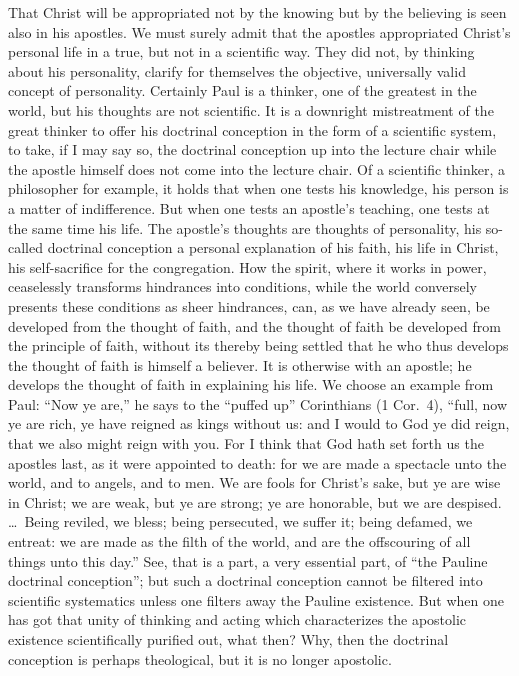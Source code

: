 \documentclass[12pt]{book}
\newcommand{\opage}[1]{\marginnote{\footnotesize\textit{[#1]}}}
\begin{document}
That Christ will be appropriated not by the knowing but by the
believing is seen also in his apostles. We must surely admit that the
apostles appropriated Christ's personal life in a
\opage{78}\setcounter{footnote}{0}%
true, but not in a scientific way. They did not, by thinking about his
personality, clarify for themselves the objective, universally valid
concept of personality. Certainly Paul is a thinker, one of the greatest
in the world, but his thoughts are not scientific. It is a downright
mistreatment of the great thinker to offer his doctrinal conception in
the form of a scientific system, to take, if I may say so, the doctrinal
conception up into the lecture chair while the apostle himself does not
come into the lecture chair. Of a scientific thinker, a philosopher for
example, it holds that when one tests his knowledge, his person is a
matter of indifference. But when one tests an apostle's teaching, one
tests at the same time his life. The apostle's thoughts are thoughts of
personality, his so-called doctrinal conception a personal explanation
of his faith, his life in Christ, his self-sacrifice for the
congregation. How the spirit, where it works in power, ceaselessly
transforms hindrances into conditions, while the world conversely
presents these conditions as sheer hindrances, can, as we have already
seen, be developed from the thought of faith, and the thought of faith
be developed from the principle of faith, without its thereby being
settled that he who thus develops the thought of faith is himself a
believer. It is otherwise with an apostle; he develops the thought of
faith in explaining his life. We choose an example from Paul: ``Now ye
are,'' he says to the ``puffed up'' Corinthians (1 Cor.~4), ``full, now
ye are rich, ye have reigned as kings without us: and I would to God ye
did reign, that we also might reign with you. For I think that God hath
set forth us the apostles last, as it were appointed to death: for we
are made a spectacle unto the world, and to angels, and to men. We are
fools for Christ's sake, but ye are wise in Christ; we are weak,
\opage{79}\setcounter{footnote}{0}%
but ye are strong; ye are honorable, but we are despised. \dots\ Being
reviled, we bless; being persecuted, we suffer it; being defamed, we
entreat: we are made as the filth of the world, and are the offscouring
of all things unto this day.'' See, that is a part, a very essential
part, of ``the Pauline doctrinal conception''; but such a doctrinal
conception cannot be filtered into scientific systematics unless one
filters away the Pauline existence. But when one has got that unity of
thinking and acting which characterizes the apostolic existence
scientifically purified out, what then? Why, then the doctrinal
conception is perhaps theological, but it is no longer apostolic.
\end{document}
